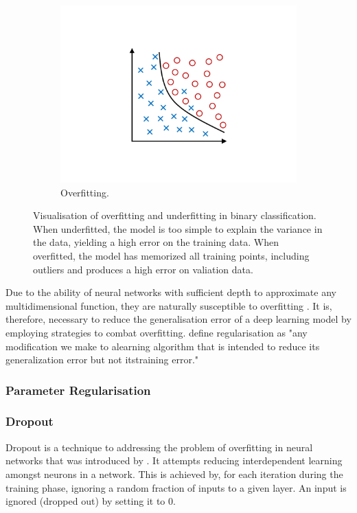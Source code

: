 \documentclass{l4proj}
\begin{document}
\begin{figure}[ht]
\begin{subfigure}[h!]{0.3\textwidth}
    \includegraphics[width=\textwidth, page={3}, trim={6.5cm 4cm 6.5cm 4cm}, clip]{images/Overfitting}
    \caption{Overfitting.}
  \end{subfigure}
  \caption{Visualisation of overfitting and underfitting in binary classification. When underfitted, the model is too simple to explain the variance in the data, yielding a high error on the training data. When overfitted, the model has memorized all training points, including outliers and produces a high error on valiation data.}
  \label{fig:fitting}
\end{figure}

Due to the ability of neural networks with sufficient depth to approximate any multidimensional function, they are naturally susceptible to overfitting \citep{tetko_neural_1995}. It is, therefore, necessary to reduce the generalisation error of a deep learning model by employing strategies to combat overfitting. \citet{goodfellow_deep_2016} define regularisation as "any modification we make to alearning algorithm that is intended to reduce its generalization error but not itstraining error."

\subsubsection{Parameter Regularisation}

\subsubsection{Dropout}

Dropout is a technique to addressing the problem of overfitting in neural networks that was introduced by \citet{srivastava_dropout_2014}. It attempts reducing interdependent learning amongst neurons in a network. This is achieved by, for each iteration during the training phase, ignoring a random fraction of inputs to a given layer. An input is ignored (dropped out) by setting it to 0.
\end{document}
